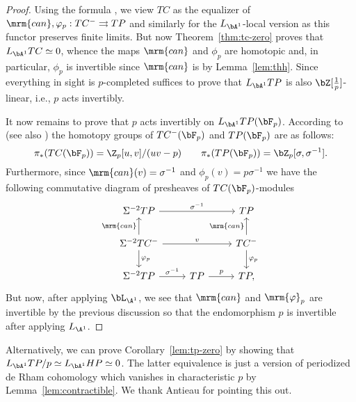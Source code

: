 \documentclass[a4paper,10pt]{amsart}
\begin{document}
 \begin{proof} Using the formula \cite{nikolaus-scholze}, we view $TC$ as the equalizer of $\mrm{can},\phi_p: TC^- \rightrightarrows TP$ and similarly for the $L_{\bA^1}$-local version as this functor preserves finite limits. But now Theorem~\ref{thm:tc-zero} proves that $L_{\bA^1}TC \simeq 0$, whence the maps $\mrm{can}$ and $\phi_p$ are homotopic and, in particular, $\phi_p$ is invertible since $\mrm{can}$ is by Lemma~\ref{lem:thh}. Since everything in sight is $p$-completed suffices to prove that $L_{\bA^1}TP$ is also $\bZ[\tfrac{1}{p}]$-linear, i.e., $p$ acts invertibly.
 
 
It now remains to prove that $p$ acts invertibly on $L_{\bA^1}TP(\bF_p)$.  According to \cite[Section IV.4]{nikolaus-scholze} (see also \cite[Proposition 12]{lebras}) the homotopy groups of $TC^-(\bF_p)$ and $TP(\bF_p)$ are as follows:
\[
\pi_*(TC(\bF_p)) = \Z_p[u,v]/(uv-p) \qquad \pi_*(TP(\bF_p)) = \bZ_p[\sigma, \sigma^{-1}].
\]
Furthermore, since $\mrm{can}(v) = \sigma^{-1}$ and $\phi_p(v) = p\sigma^{-1}$ we have the following commutative diagram of presheaves of $TC(\bF_p)$-modules
\begin{equation} \label{eq:phi-can}
\begin{tikzcd}
\Sigma^{-2}TP \ar{rr}{\sigma^{-1}} &  & TP \\
\Sigma^{-2}TC^- \ar{rr}{v} \ar{u}{\mrm{can}} \ar{d}{\phi_p} & & TC^-\ar{u}{\mrm{can}} \ar{d}{\phi_p}\\
\Sigma^{-2}TP \ar{r}{\sigma^{-1}} & TP \ar{r}{p} & TP,
\end{tikzcd}
\end{equation}
But now, after applying $\bL_{\A^1}$, we see that $\mrm{can}$ and $\mrm{\phi}_p$ are invertible by the previous discussion so that the endomorphism $p$ is invertible after applying $L_{\A^1}$.


 \end{proof}
%
%
%

\begin{rem} \label{rem:alternate} Alternatively, we can prove Corollary~\ref{lem:tp-zero} by showing that $L_{\bA^1}TP/p \simeq L_{\bA^1}HP \simeq 0$. The latter equivalence is just a version of periodized de Rham cohomology which vanishes in characteristic $p$ by Lemma~\ref{lem:contractible}. We thank Antieau for pointing this out.
\end{rem}
\end{document}
